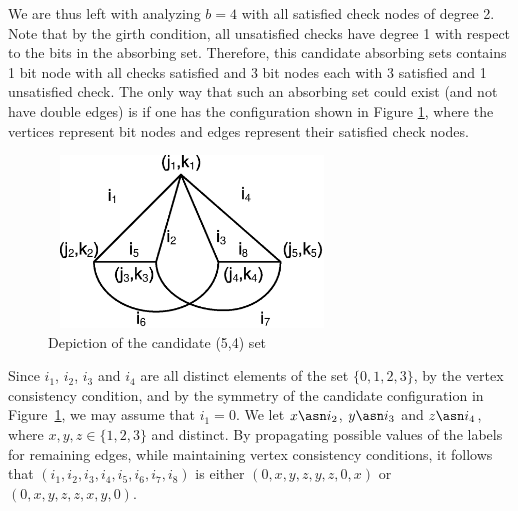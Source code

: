 We are thus left with analyzing $b=4$ with all satisfied check
nodes of degree 2. Note that by the girth condition, all
unsatisfied checks have degree 1 with respect to the bits in the
absorbing set. Therefore, this candidate absorbing sets contains 1
bit node with all checks satisfied and 3 bit nodes each with 3
satisfied and 1 unsatisfied check. The only way that such an
absorbing set could exist (and not have double edges) is if one
has the configuration shown in Figure \ref{fig52}, where the
vertices represent bit nodes and edges represent their satisfied
check nodes.


\begin{figure}
\center\includegraphics[width=3.0in,height=1.8in]{Drawing22_1.eps}
\caption{Depiction of the candidate (5,4) set} \label{fig52}
\end{figure}

Since $i_1$, $i_2$, $i_3$ and $i_4$ are all distinct elements of
the set $\{0,1,2,3\}$, by the vertex consistency condition, and by
the symmetry of the candidate configuration in Figure~\ref{fig52},
we may assume that $i_1=0$. We let $x \asn i_2$, $y \asn i_3$ and
$z \asn i_4$, where $x,y,z \in \{1,2,3 \}$ and distinct. By
propagating possible values of the labels for remaining edges,
while maintaining vertex consistency conditions, it follows that
$(i_1,i_2,i_3,i_4,i_5,i_6,i_7,i_8)$ is either $(0,x,y,z,y,z,0,x)$
or $(0,x,y,z,z,x,y,0)$.

